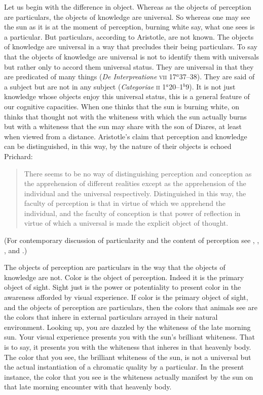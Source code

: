 Let us begin with the difference in object. Whereas as the objects of perception are particulars, the objects of knowledge are universal. So whereas one may see the sun as it is at the moment of perception, burning white say, what one sees is a particular. But particulars, according to Aristotle, are not known. The objects of knowledge are universal in a way that precludes their being particulars. To say that the objects of knowledge are universal is not to identify them with universals but rather only to accord them universal status. They are universal in that they are predicated of many things (\emph{De Interpreatione} \textsc{vii} 17\( ^{a} \)37--38). They are said of a subject but are not in any subject (\emph{Categoriae} \textsc{ii} 1\( ^{a} \)20--1\( ^{b} \)9). It is not just knowledge whose objects enjoy this universal status, this is a general feature of our cognitive capacities. When one thinks that the sun is burning white, on thinks that thought not with the whiteness with which the sun actually burns but with a whiteness that the sun may share with the son of Diares, at least when viewed from a distance. Aristotle's claim that perception and knowledge can be distinguished, in this way, by the nature of their objects is echoed Prichard:
\begin{quote}
	There seems to be no way of distinguishing perception and conception as the apprehension of different realities except as the apprehension of the individual and the universal respectively. Distinguished in this way, the faculty of perception is that in virtue of which we apprehend the individual, and the faculty of conception is that power of reflection in virtue of which a universal is made the explicit object of thought. \citep[]{Prichard:1909yg}
\end{quote}
(For contemporary discussion of particularity and the content of perception see \citealt{Brewer:2008fk}, \citealt{Martin:2002jb}, \citealt{Soteriou:2000iz,Soteriou:2005fk}, and \citealt{Travis:2005ys}.)

The objects of perception are particulars in the way that the objects of knowledge are not. Color is the object of perception. Indeed it is the primary object of sight. Sight just is the power or potentiality to present color in the awareness afforded by visual experience. If color is the primary object of sight, and the objects of perception are particulars, then the colors that animals see are the colors that inhere in external particulars arrayed in their natural environment. Looking up, you are dazzled by the whiteness of the late morning sun. Your visual experience presents you with the sun's brilliant whiteness. That is to say, it presents you with the whiteness that inheres in that heavenly body. The color that you see, the brilliant whiteness of the sun, is not a universal but the actual instantiation of a chromatic quality by a particular. In the present instance, the color that you see is the whiteness actually manifest by the sun on that late morning encounter with that heavenly body.

